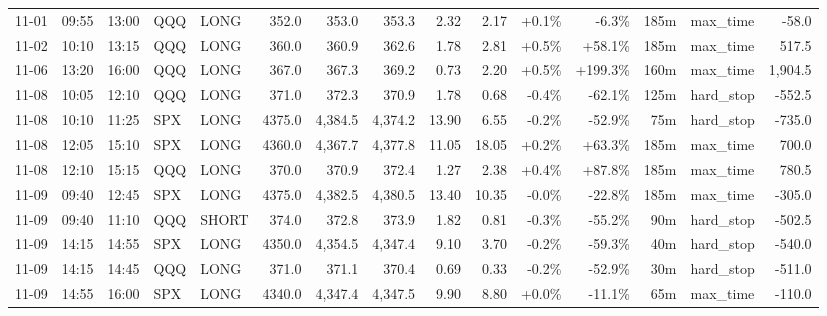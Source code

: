 \documentclass[11pt,a4paper,twoside]{article}
\begin{document}
\begin{landscape}
\begin{center}
\begin{longtable}{>{\color{txtmain}}l l l l l r r r r r r r r >{\color{txtmain}}l r}
11-01 & 09:55 & 13:00 & QQQ & LONG & 352.0 & 353.0 & 353.3 & 2.32 & 2.17 & \textcolor{wingreen}{+0.1\%} & \textcolor{lossred}{-6.3\%} & 185m & max\_time & \textcolor{lossred}{-58.0} \\
11-02 & 10:10 & 13:15 & QQQ & LONG & 360.0 & 360.9 & 362.6 & 1.78 & 2.81 & \textcolor{wingreen}{+0.5\%} & \textcolor{wingreen}{+58.1\%} & 185m & max\_time & \textcolor{wingreen}{517.5} \\
11-06 & 13:20 & 16:00 & QQQ & LONG & 367.0 & 367.3 & 369.2 & 0.73 & 2.20 & \textcolor{wingreen}{+0.5\%} & \textcolor{wingreen}{+199.3\%} & 160m & max\_time & \textcolor{wingreen}{1,904.5} \\
11-08 & 10:05 & 12:10 & QQQ & LONG & 371.0 & 372.3 & 370.9 & 1.78 & 0.68 & \textcolor{lossred}{-0.4\%} & \textcolor{lossred}{-62.1\%} & 125m & hard\_stop & \textcolor{lossred}{-552.5} \\
11-08 & 10:10 & 11:25 & SPX & LONG & 4375.0 & 4,384.5 & 4,374.2 & 13.90 & 6.55 & \textcolor{lossred}{-0.2\%} & \textcolor{lossred}{-52.9\%} & 75m & hard\_stop & \textcolor{lossred}{-735.0} \\
11-08 & 12:05 & 15:10 & SPX & LONG & 4360.0 & 4,367.7 & 4,377.8 & 11.05 & 18.05 & \textcolor{wingreen}{+0.2\%} & \textcolor{wingreen}{+63.3\%} & 185m & max\_time & \textcolor{wingreen}{700.0} \\
11-08 & 12:10 & 15:15 & QQQ & LONG & 370.0 & 370.9 & 372.4 & 1.27 & 2.38 & \textcolor{wingreen}{+0.4\%} & \textcolor{wingreen}{+87.8\%} & 185m & max\_time & \textcolor{wingreen}{780.5} \\
11-09 & 09:40 & 12:45 & SPX & LONG & 4375.0 & 4,382.5 & 4,380.5 & 13.40 & 10.35 & \textcolor{lossred}{-0.0\%} & \textcolor{lossred}{-22.8\%} & 185m & max\_time & \textcolor{lossred}{-305.0} \\
11-09 & 09:40 & 11:10 & QQQ & SHORT & 374.0 & 372.8 & 373.9 & 1.82 & 0.81 & \textcolor{lossred}{-0.3\%} & \textcolor{lossred}{-55.2\%} & 90m & hard\_stop & \textcolor{lossred}{-502.5} \\
11-09 & 14:15 & 14:55 & SPX & LONG & 4350.0 & 4,354.5 & 4,347.4 & 9.10 & 3.70 & \textcolor{lossred}{-0.2\%} & \textcolor{lossred}{-59.3\%} & 40m & hard\_stop & \textcolor{lossred}{-540.0} \\
11-09 & 14:15 & 14:45 & QQQ & LONG & 371.0 & 371.1 & 370.4 & 0.69 & 0.33 & \textcolor{lossred}{-0.2\%} & \textcolor{lossred}{-52.9\%} & 30m & hard\_stop & \textcolor{lossred}{-511.0} \\
11-09 & 14:55 & 16:00 & SPX & LONG & 4340.0 & 4,347.4 & 4,347.5 & 9.90 & 8.80 & \textcolor{wingreen}{+0.0\%} & \textcolor{lossred}{-11.1\%} & 65m & max\_time & \textcolor{lossred}{-110.0} \\

\end{longtable}
\end{center}
\end{landscape}
\end{document}
